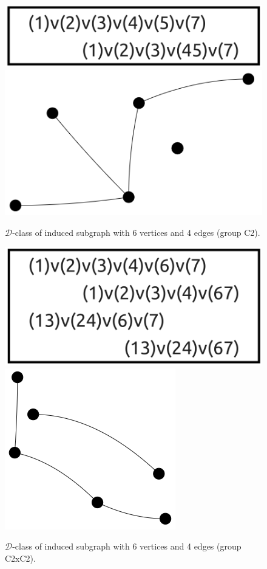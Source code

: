 \begin{appendices}
\begin{figure}[H]
\includegraphics[scale=0.1]{images/x9/x9_6v_4e_1.png}
\includegraphics[scale=0.15]{images/x9/x9_6v_4e_1_vis.png}
\caption{$\mathcal{D}$-class of induced subgraph with 6 vertices and 4 edges (group C2).}
\end{figure}

\begin{figure}[H]
\includegraphics[scale=0.1]{images/x9/x9_6v_4e_2.png}
\includegraphics[scale=0.15]{images/x9/x9_6v_4e_2_vis.png}
\caption{$\mathcal{D}$-class of induced subgraph with 6 vertices and 4 edges (group C2xC2).}
\end{figure}


\end{appendices}
